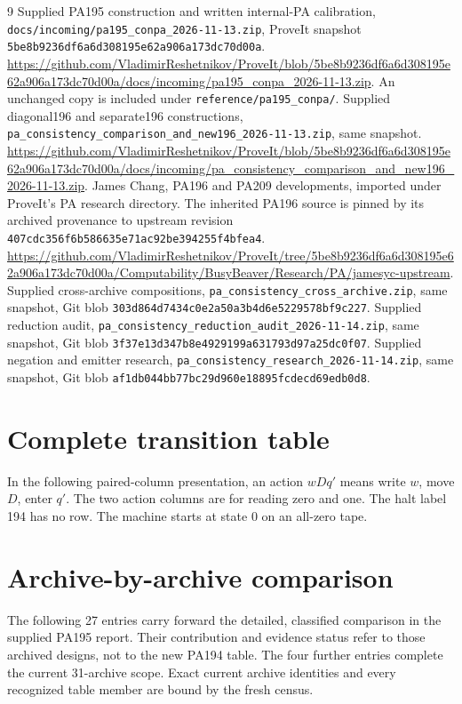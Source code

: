 \documentclass[11pt,letterpaper]{article}
\newcommand{\file}[1]{\texttt{\nolinkurl{#1}}}
\begin{document}
\begin{thebibliography}{9}
 Supplied PA195 construction and written internal-PA
calibration, \file{docs/incoming/pa195_conpa_2026-11-13.zip}, ProveIt
snapshot \file{5be8b9236df6a6d308195e62a906a173dc70d00a}.
\url{https://github.com/VladimirReshetnikov/ProveIt/blob/5be8b9236df6a6d308195e62a906a173dc70d00a/docs/incoming/pa195_conpa_2026-11-13.zip}.
An unchanged copy is included under \file{reference/pa195_conpa/}.
 Supplied diagonal196 and separate196 constructions,
\file{pa_consistency_comparison_and_new196_2026-11-13.zip}, same snapshot.
\url{https://github.com/VladimirReshetnikov/ProveIt/blob/5be8b9236df6a6d308195e62a906a173dc70d00a/docs/incoming/pa_consistency_comparison_and_new196_2026-11-13.zip}.
 James Chang, PA196 and PA209 developments, imported
under ProveIt's PA research directory. The inherited PA196 source is
pinned by its archived provenance to upstream revision
\file{407cdc356f6b586635e71ac92be394255f4bfea4}.
\url{https://github.com/VladimirReshetnikov/ProveIt/tree/5be8b9236df6a6d308195e62a906a173dc70d00a/Computability/BusyBeaver/Research/PA/jamesyc-upstream}.
 Supplied cross-archive compositions,
\file{pa_consistency_cross_archive.zip}, same snapshot, Git blob
\file{303d864d7434c0e2a50a3b4d6e5229578bf9c227}.
 Supplied reduction audit,
\file{pa_consistency_reduction_audit_2026-11-14.zip}, same snapshot,
Git blob \file{3f37e13d347b8e4929199a631793d97a25dc0f07}.
 Supplied negation and emitter research,
\file{pa_consistency_research_2026-11-14.zip}, same snapshot,
Git blob \file{af1db044bb77bc29d960e18895fcdecd69edb0d8}.
\end{thebibliography}

\clearpage
\appendix
\section{Complete transition table}
\label{app:table}
In the following paired-column presentation, an action $wDq'$ means
write $w$, move $D$, enter $q'$. The two action columns are for reading
zero and one. The halt label 194 has no row. The machine starts at
state 0 on an all-zero tape.


\clearpage
\section{Archive-by-archive comparison}
\label{app:archives}
The following 27 entries carry forward the detailed, classified
comparison in the supplied PA195 report. Their contribution and
evidence status refer to those archived designs, not to the new
PA194 table. The four further entries complete the current 31-archive
scope. Exact current archive identities and every recognized table
member are bound by the fresh census.

\end{document}
